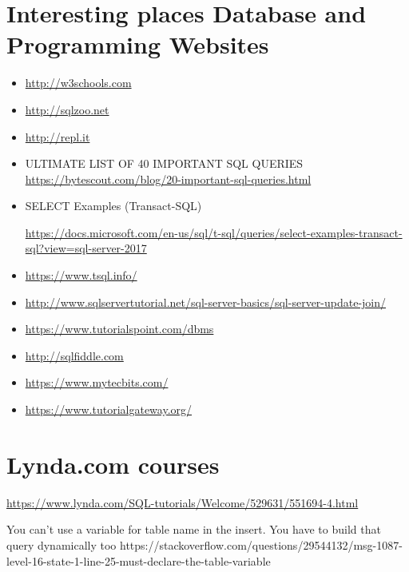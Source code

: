 \newpage
\section  {Interesting places Database and Programming Websites}

\begin{itemize}
\item \url{http://w3schools.com}
\item \url{http://sqlzoo.net} 
\item \url{http://repl.it} 
\item ULTIMATE LIST OF 40 IMPORTANT SQL QUERIES 
\subitem \url{https://bytescout.com/blog/20-important-sql-queries.html}
\item SELECT Examples (Transact-SQL) 

\subitem \url{https://docs.microsoft.com/en-us/sql/t-sql/queries/select-examples-transact-sql?view=sql-server-2017}

\item \url{https://www.tsql.info/}
\item \url{http://www.sqlservertutorial.net/sql-server-basics/sql-server-update-join/}
\item \url{https://www.tutorialspoint.com/dbms}
\item \url{http://sqlfiddle.com}
\item \url{https://www.mytecbits.com/}
\item \url{https://www.tutorialgateway.org/}

\end{itemize}

\section  * {Lynda.com courses}
\url{https://www.lynda.com/SQL-tutorials/Welcome/529631/551694-4.html}


You can't use a variable for table name in the insert. You have to build that query dynamically too
https://stackoverflow.com/questions/29544132/msg-1087-level-16-state-1-line-25-must-declare-the-table-variable